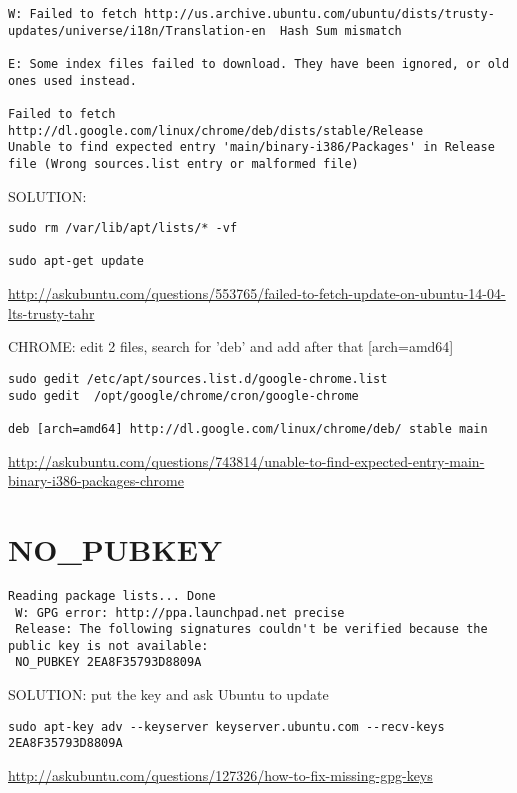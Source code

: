 \begin{verbatim}
W: Failed to fetch http://us.archive.ubuntu.com/ubuntu/dists/trusty-updates/universe/i18n/Translation-en  Hash Sum mismatch

E: Some index files failed to download. They have been ignored, or old ones used instead.

Failed to fetch http://dl.google.com/linux/chrome/deb/dists/stable/Release  
Unable to find expected entry 'main/binary-i386/Packages' in Release file (Wrong sources.list entry or malformed file)
\end{verbatim}

SOLUTION:
\begin{verbatim}
sudo rm /var/lib/apt/lists/* -vf

sudo apt-get update 
\end{verbatim}
\url{http://askubuntu.com/questions/553765/failed-to-fetch-update-on-ubuntu-14-04-lts-trusty-tahr}



CHROME: edit 2 files, search for 'deb' and add after that [arch=amd64]
\begin{verbatim}
sudo gedit /etc/apt/sources.list.d/google-chrome.list
sudo gedit  /opt/google/chrome/cron/google-chrome

deb [arch=amd64] http://dl.google.com/linux/chrome/deb/ stable main

\end{verbatim}
\url{http://askubuntu.com/questions/743814/unable-to-find-expected-entry-main-binary-i386-packages-chrome}

\section{NO\_PUBKEY}

\begin{verbatim}
Reading package lists... Done  
 W: GPG error: http://ppa.launchpad.net precise 
 Release: The following signatures couldn't be verified because the public key is not available: 
 NO_PUBKEY 2EA8F35793D8809A
\end{verbatim}


SOLUTION: put the key and ask Ubuntu to update
\begin{verbatim}
sudo apt-key adv --keyserver keyserver.ubuntu.com --recv-keys 2EA8F35793D8809A
\end{verbatim}
\url{http://askubuntu.com/questions/127326/how-to-fix-missing-gpg-keys}



